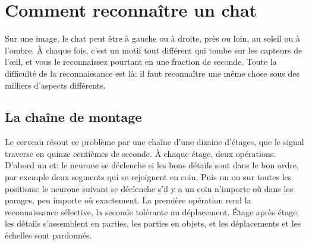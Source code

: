 \chapter{Comment reconnaître un chat}


Sur une image, le chat peut être à gauche ou à droite, près ou loin, au soleil ou à l'ombre. À chaque fois, c'est un motif tout différent qui tombe sur les capteurs de l'œil, et vous le reconnaissez pourtant en une fraction de seconde. Toute la difficulté de la reconnaissance est là: il faut reconnaître une même chose sous des milliers d'aspects différents.

\section*{La chaîne de montage}

Le cerveau résout ce problème par une chaîne d'une dizaine d'étages, que le signal traverse en quinze centièmes de seconde. À chaque étage, deux opérations. D'abord un \og et\fg{}: le neurone se déclenche si les bons détails sont dans le bon ordre, par exemple deux segments qui se rejoignent en coin. Puis un \og ou sur toutes les positions\fg{}: le neurone suivant se déclenche s'il y a un coin n'importe où dans les parages, peu importe où exactement. La première opération rend la reconnaissance sélective, la seconde tolérante au déplacement. Étage après étage, les détails s'assemblent en parties, les parties en objets, et les déplacements et les échelles sont pardonnés.


